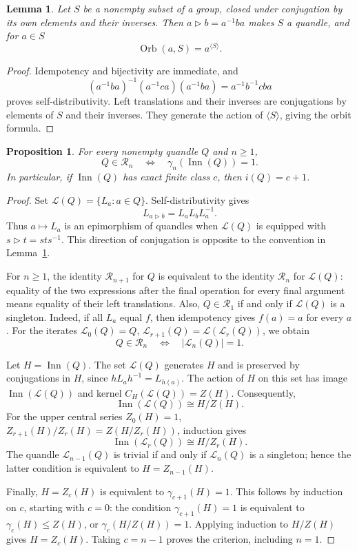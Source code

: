 \documentclass[11pt,a4paper]{article}
\newtheorem{lemma}[theorem]{Lemma}
\newtheorem{proposition}[theorem]{Proposition}
\theoremstyle{definition}
\theoremstyle{remark}
\newcommand{\R}{\mathcal R}
\newcommand{\Inn}{\operatorname{Inn}}
\newcommand{\Orb}{\operatorname{Orb}}
\newcommand{\conj}{\triangleright}
\begin{document}
\begin{lemma}\label{lem:orbits}
Let \(S\) be a nonempty subset of a group, closed under
conjugation by its own elements and their inverses.
Then \(a\conj b=a^{-1}ba\) makes \(S\) a quandle, and for \(a\in S\)
\[
 \Orb(a,S)=a^{\langle S\rangle}.
\]
\end{lemma}
\begin{proof}
Idempotency and bijectivity are immediate, and
\[
 (a^{-1}ba)^{-1}(a^{-1}ca)(a^{-1}ba)=a^{-1}b^{-1}cba
\]
proves self-distributivity.
Left translations and their inverses are conjugations by
elements of \(S\) and their inverses. They generate the action
of \(\langle S\rangle\), giving the orbit formula.
\end{proof}

\begin{proposition}\label{prop:criterion}
For every nonempty quandle \(Q\) and \(n\ge1\),
\[
 Q\in\R_n\quad\Longleftrightarrow\quad
 \gamma_n(\Inn(Q))=1.
\]
In particular, if \(\Inn(Q)\) has exact finite class \(c\),
then \(i(Q)=c+1\).
\end{proposition}
\begin{proof}
Set \(\mathcal L(Q)=\{L_a:a\in Q\}\).
Self-distributivity gives
\[
 L_{a\conj b}=L_aL_bL_a^{-1}.
\]
Thus \(a\mapsto L_a\) is an epimorphism of quandles
when \(\mathcal L(Q)\) is equipped with \(s\conj t=sts^{-1}\).
This direction of conjugation is opposite to the convention
in Lemma~\ref{lem:orbits}.

For \(n\ge1\), the identity \(\R_{n+1}\) for \(Q\)
is equivalent to the identity \(\R_n\) for \(\mathcal L(Q)\):
equality of the two expressions after the final operation
for every final argument means equality of their left translations.
Also, \(Q\in\R_1\) if and only if \(\mathcal L(Q)\) is a singleton.
Indeed, if all \(L_a\) equal \(f\), then idempotency gives
\(f(a)=a\) for every \(a\).
For the iterates \(\mathcal L_0(Q)=Q\),
\(\mathcal L_{r+1}(Q)=\mathcal L(\mathcal L_r(Q))\), we obtain
\[
 Q\in\R_n\quad\Longleftrightarrow\quad
 |\mathcal L_n(Q)|=1.
\]

Let \(H=\Inn(Q)\). The set \(\mathcal L(Q)\) generates \(H\)
and is preserved by conjugations in \(H\), since \(hL_ah^{-1}=L_{h(a)}\).
The action of \(H\) on this set has image
\(\Inn(\mathcal L(Q))\) and kernel \(C_H(\mathcal L(Q))=Z(H)\).
Consequently,
\[
 \Inn(\mathcal L(Q))\cong H/Z(H).
\]
For the upper central series \(Z_0(H)=1\),
\(Z_{r+1}(H)/Z_r(H)=Z(H/Z_r(H))\), induction gives
\[
 \Inn(\mathcal L_r(Q))\cong H/Z_r(H).
\]
The quandle \(\mathcal L_{n-1}(Q)\) is trivial if and only if
\(\mathcal L_n(Q)\) is a singleton; hence the latter condition
is equivalent to \(H=Z_{n-1}(H)\).

Finally, \(H=Z_c(H)\) is equivalent to \(\gamma_{c+1}(H)=1\).
This follows by induction on \(c\), starting with \(c=0\):
the condition \(\gamma_{c+1}(H)=1\) is equivalent to
\(\gamma_c(H)\le Z(H)\), or \(\gamma_c(H/Z(H))=1\).
Applying induction to \(H/Z(H)\) gives \(H=Z_c(H)\).
Taking \(c=n-1\) proves the criterion, including \(n=1\).
\end{proof}
\end{document}
